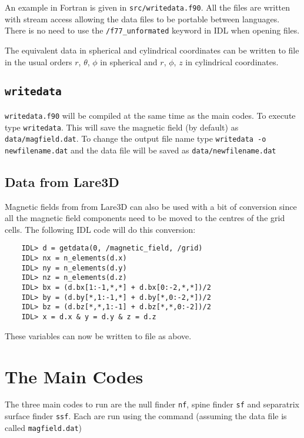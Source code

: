 \documentclass[12pt]{article}
\begin{document}
    An example in Fortran is given in \texttt{src/writedata.f90}. All the files are written with stream access allowing the data files to be portable between languages. There is no need to use the \texttt{/f77\_unformated} keyword in IDL when opening files.

    The equivalent data in spherical and cylindrical coordinates can be written to file in the usual orders \( r \), \( \theta \), \( \phi \) in spherical and \( r \), \( \phi \), \( z \) in cylindrical coordinates.

    \subsection{\texttt{writedata}}

    \texttt{writedata.f90} will be compiled at the same time as the main codes. To execute type \texttt{writedata}. This will save the magnetic field (by default) as \texttt{data/magfield.dat}. To change the output file name type \texttt{writedata -o newfilename.dat} and the data file will be saved as \texttt{data/newfilename.dat}

    \subsection{Data from Lare3D}

      Magnetic fields from from Lare3D can also be used with a bit of conversion since all the magnetic field components need to be moved to the centres of the grid cells. The following IDL code will do this conversion:

      \begin{verbatim}
    IDL> d = getdata(0, /magnetic_field, /grid)
    IDL> nx = n_elements(d.x)
    IDL> ny = n_elements(d.y)
    IDL> nz = n_elements(d.z)
    IDL> bx = (d.bx[1:-1,*,*] + d.bx[0:-2,*,*])/2
    IDL> by = (d.by[*,1:-1,*] + d.by[*,0:-2,*])/2
    IDL> bz = (d.bz[*,*,1:-1] + d.bz[*,*,0:-2])/2
    IDL> x = d.x & y = d.y & z = d.z
      \end{verbatim}

      These variables can now be written to file as above.

  \section{The Main Codes}

    The three main codes to run are the null finder \texttt{nf}, spine finder \texttt{sf} and separatrix surface finder \texttt{ssf}. Each are run using the command (assuming the data file is called \texttt{magfield.dat})
\end{document}
